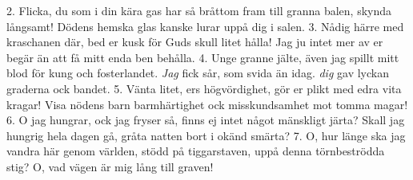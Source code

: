 2.  Flicka, du som i din kära gas
    har så bråttom fram till granna balen,
    skynda långsamt! Dödens hemska glas
    kanske lurar uppå dig i salen.
3.  Nådig härre med kraschanen där,
    bed er kusk för Guds skull litet hålla!
    Jag ju intet mer av er begär
    än att få mitt enda ben behålla.
4.  Unge granne jälte, även jag
    spillt mitt blod för kung och fosterlandet.
    \textit{Jag} fick sår, som svida än idag.
    \textit{dig} gav lyckan graderna ock bandet.
5.  Vänta litet, ers högvördighet,
    gör er plikt med edra vita kragar!
    Visa nödens barn barmhärtighet
    ock misskundsamhet mot tomma magar!
6.  O jag hungrar, ock jag fryser så,
    finns ej intet något mänskligt järta?
    Skall jag hungrig hela dagen gå,
    gråta natten bort i okänd smärta?
7.  O, hur länge ska jag vandra här
    genom världen, stödd på tiggarstaven,
    uppå denna törnbeströdda stig?
    O, vad vägen är mig lång till graven!
